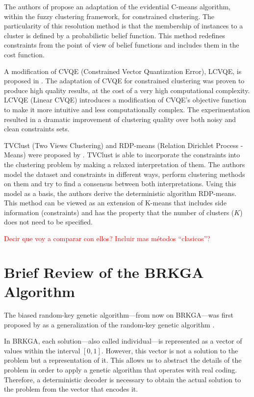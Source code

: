 \documentclass[review]{elsarticle}
\begin{document}
The authors of \cite{antoine2012cecm} propose an adaptation of the evidential C-means algorithm, within the fuzzy clustering framework, for constrained clustering. The particularity of this resolution method is that the membership of instances to a cluster is defined by a probabilistic belief function. This method redefines constraints from the point of view of belief functions and includes them in the cost function.

A modification of CVQE (Constrained Vector Quantization Error), LCVQE, is proposed in \cite{pelleg2007k}. The adaptation of CVQE for constrained clustering was proven to produce high quality results, at the cost of a very high computational complexity. LCVQE (Linear CVQE) introduces a modification of CVQE's objective function to make it more intuitive and less computationally complex. The experimentation resulted in a dramatic improvement of clustering quality over both noisy and clean constraints sets.

TVClust (Two Views Clustering) and RDP-means (Relation Dirichlet Process - Means) were proposed by \cite{khashabi2015clustering}. TVClust is able to incorporate the constraints into the clustering problem by making a relaxed interpretation of them. The authors model the dataset and constraints in different ways, perform clustering methods on them and try to find a consensus between both interpretations. Using this model as a basis, the authors derive the deterministic algorithm RDP-means. This method can be viewed as an extension of K-means that includes side information (constraints) and has the property that the number of clusters ($K$) does not need to be specified.

\textcolor{red}{Decir que voy a comparar con ellos? Incluir mas métodos ``clasicos''?}

\section{Brief Review of the BRKGA Algorithm}

The biased random-key genetic algorithm---from now on BRKGA---was first proposed by \cite{gonccalves2011biased} as a generalization of the random-key genetic algorithm \cite{bean1994genetic}.

In BRKGA, each solution---also called individual---is represented as a vector of values within the interval $[0,1]$. However, this vector is not a solution to the problem but a representation of it. This allows us to abstract the details of the problem in order to apply a genetic algorithm that operates with real coding. Therefore, a deterministic decoder is necessary to obtain the actual solution to the problem from the vector that encodes it.
\end{document}
